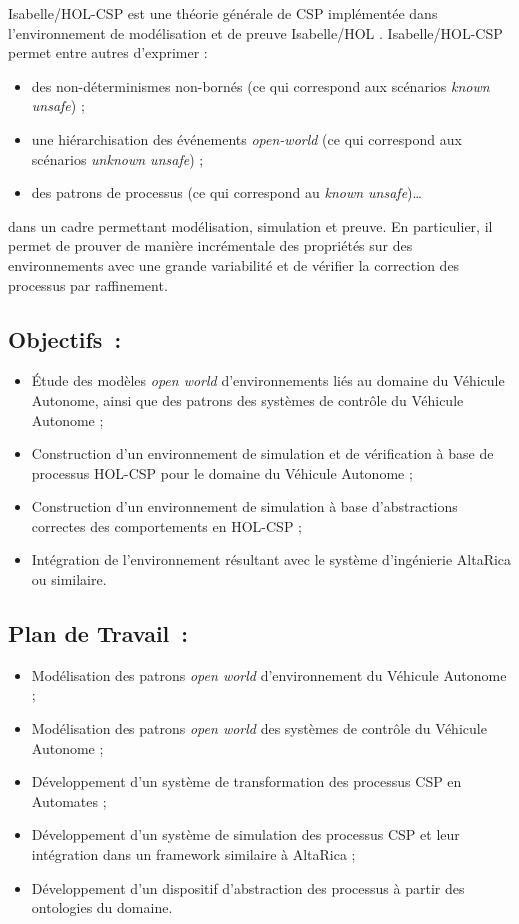\documentclass[a4paper,10pt]{article}
\begin{document}
Isabelle/HOL-CSP \cite{HOL-CSP-AFP} est une théorie générale de CSP
implémentée dans l'environnement de modélisation et de preuve
Isabelle/HOL \cite{nipkow.ea:isabelle:2002}.
Isabelle/HOL-CSP permet entre autres d'exprimer :
%
\begin{itemize}
  \item
    des non-déterminismes non-bornés
    (ce qui correspond aux scénarios \emph{known unsafe}) ;
  \item
    une hiérarchisation des événements \emph{open-world}
    (ce qui correspond aux scénarios \emph{unknown unsafe}) ;
  \item
    des patrons de processus (ce qui correspond au \emph{known unsafe})\ldots
\end{itemize}
%
dans un cadre permettant modélisation, simulation et preuve.
En particulier, il permet de prouver de manière incrémentale des propriétés
sur des environnements avec une grande variabilité
et de vérifier la correction des processus par raffinement.

\subsection*{Objectifs~:}
\begin{itemize}
  \item
    Étude des modèles \emph{open world} d'environnements liés
    au domaine du Véhicule Autonome,
    ainsi que des patrons des systèmes de contrôle du Véhicule Autonome ;
\item
  Construction d'un environnement de simulation et de vérification
  à base de processus HOL-CSP pour le domaine du Véhicule Autonome ;
\item
  Construction d'un environnement de simulation
  à base d'abstractions correctes des comportements en HOL-CSP ;
\item
  Intégration de l'environnement résultant
  avec le système d'ingénierie AltaRica ou similaire.
\end{itemize}

\subsection*{Plan de Travail~:}
\begin{itemize}
  \item
    Modélisation des patrons \emph{open world}
    d'environnement du Véhicule Autonome ;
  \item
    Modélisation des patrons \emph{open world}
    des systèmes de contrôle du Véhicule Autonome ;
  \item
    Développement d'un système de transformation
    des processus CSP en Automates ;
  \item
    Développement d'un système de simulation des processus CSP
    et leur intégration dans un framework similaire à AltaRica ;
  \item
    Développement d'un dispositif d'abstraction des processus
    à partir des ontologies du domaine.
\end{itemize}
\end{document}

